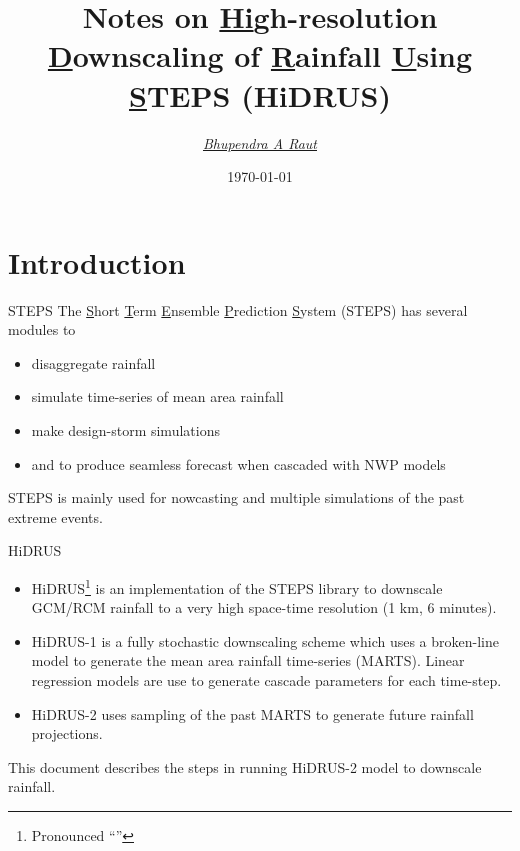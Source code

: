 \documentclass[aspectratio=169]{beamer}
\begin{document}
\title{\Large \noindent \textbf{\textcolor{egyptianblue}{Notes on \underline{Hi}gh-resolution \underline{D}ownscaling of \underline{R}ainfall \underline{U}sing \underline{S}TEPS (HiDRUS)}}}  

\author{\emph{\href{www.baraut.info}{Bhupendra A Raut}}} 
\date{\today} 

\frame{\titlepage} 

\section{Introduction}
%
\begin{frame}{STEPS} %
The  \underline{S}hort \underline{T}erm \underline{E}nsemble \underline{P}rediction \underline{S}ystem (STEPS)  has several modules to 

\begin{itemize}
\item disaggregate rainfall \citep{seed2013steps}
\item simulate time-series of mean area rainfall \citep{seed2000BL}
\item make design-storm simulations \citep{seed1999steps} 
\item and to produce seamless forecast when cascaded with NWP models \citep{bowler2006steps}
\end{itemize}

STEPS is mainly used for nowcasting and multiple simulations of the past extreme events.
\end{frame}
%
%
%
%
%
\begin{frame}{HiDRUS} %
\begin{itemize}
\item HiDRUS\footnote{Pronounced ``''} is an implementation of the STEPS library to downscale GCM/RCM rainfall to a very high space-time resolution (1 km, 6 minutes).
\item HiDRUS-1 is a fully stochastic downscaling scheme which uses a broken-line model to generate the mean area rainfall time-series (MARTS). Linear regression models are use to generate cascade parameters for each time-step. 
\item HiDRUS-2 uses sampling of the past MARTS to generate future rainfall projections. 
\end{itemize}
This document describes the steps in running HiDRUS-2 model to downscale rainfall.
\end{frame}
%
%
%
%
\end{document}

